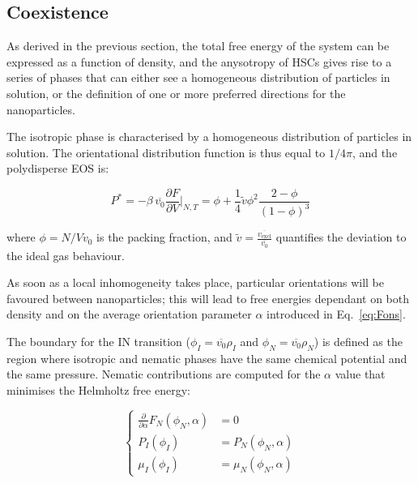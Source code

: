 \documentclass[journal=jacsat,manuscript=article]{achemso}
\begin{document}
\subsection{Coexistence}

As derived in the previous section, the  total free energy of the system can be expressed as a function of density, and the anysotropy of HSCs gives rise to a series of phases that can either see a homogeneous distribution of particles in solution, or the definition of one or more preferred directions for the nanoparticles. 

The isotropic phase is characterised by a homogeneous distribution of particles in solution. The orientational distribution function is thus equal to $1/4\pi$, and the polydisperse EOS is:

\begin{equation}
	P^* =  - \beta \, \overline{v_0} \frac{\partial F}{\partial V} \Bigg \rvert _{N, T} = \phi + \frac{1}{4} \tilde{v} \phi^2 \frac{2 - \phi}{(1 - \phi)^3} \label{ParsonLee}
\end{equation}

where $\phi=N/V v_0$ is the packing fraction, and   $\tilde{v} = \frac{\overline{v_\mathrm{excl}}}{\overline{v_0}}$ quantifies the deviation to the ideal gas behaviour.

As soon as a local inhomogeneity takes place, particular orientations will be favoured between nanoparticles; this will lead to free energies dependant on both density and on  the average orientation parameter $\alpha$ introduced in  Eq.~\ref{eq:Fons}.
 
The boundary for the IN transition  ($\phi_I = \overline{v_0} \rho_I$ and $\phi_N = \overline{v_0} \rho_N$) is defined as the region where isotropic and nematic phases have  the same chemical potential and the same pressure. Nematic contributions are computed for the  $\alpha$ value that  minimises the Helmholtz free energy:

\begin{equation}
\begin{cases}
	\frac{\partial}{\partial \alpha}  F_N(\phi_N, \alpha) &= 0\\
	P_I(\phi_I) &= P_N(\phi_N, \alpha) \\
	\mu_I(\phi_I) &= \mu_N(\phi_N, \alpha)
\end{cases}
\end{equation}


\end{document}
